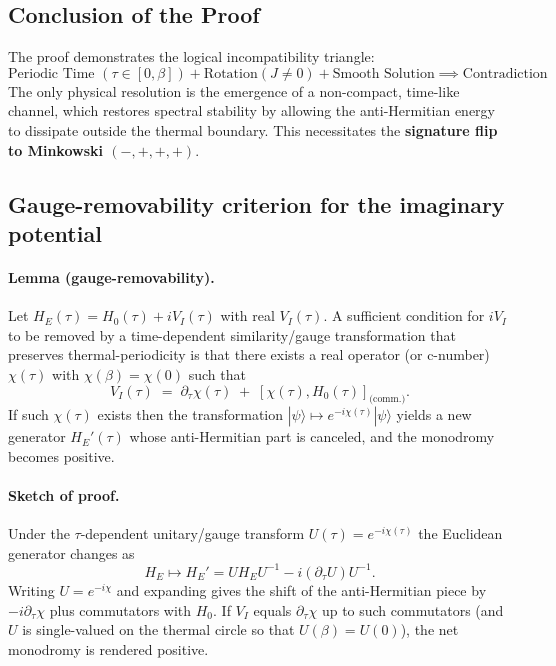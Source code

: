 \documentclass[11pt]{article}
\begin{document}
\subsection{Conclusion of the Proof}

The proof demonstrates the logical incompatibility triangle:
\[
    \text{Periodic Time } (\tau \in [0,\beta]) + \text{Rotation} (J \neq 0) + \text{Smooth Solution} \implies \text{Contradiction}
\]
The only physical resolution is the emergence of a non-compact, time-like channel, which restores spectral stability by allowing the anti-Hermitian energy to dissipate outside the thermal boundary. This necessitates the \textbf{signature flip to Minkowski $(-,+,+,+)$}.


\subsection*{Gauge-removability criterion for the imaginary potential}

\paragraph{Lemma (gauge-removability).}
Let \(H_E(\tau)=H_0(\tau)+iV_I(\tau)\) with real \(V_I(\tau)\). A sufficient condition for \(iV_I\) to be removed by a time-dependent similarity/gauge transformation that preserves thermal-periodicity is that there exists a real operator (or c-number) \(\chi(\tau)\) with \(\chi(\beta)=\chi(0)\) such that
\[
V_I(\tau) \;=\; \partial_\tau\chi(\tau) \;+\; [\chi(\tau),H_0(\tau)]_{\text{(comm.)}}.
\]
If such \(\chi(\tau)\) exists then the transformation \(|\psi\rangle\mapsto e^{-i\chi(\tau)}|\psi\rangle\) yields a new generator \(H_E'(\tau)\) whose anti-Hermitian part is canceled, and the monodromy becomes positive.

\paragraph{Sketch of proof.}
Under the \(\tau\)-dependent unitary/gauge transform \(U(\tau)=e^{-i\chi(\tau)}\) the Euclidean generator changes as
\[
H_E \mapsto H_E' = U H_E U^{-1} - i(\partial_\tau U)U^{-1} .
\]
Writing \(U=e^{-i\chi}\) and expanding gives the shift of the anti-Hermitian piece by \(-i\partial_\tau\chi\) plus commutators with \(H_0\). If \(V_I\) equals \(\partial_\tau\chi\) up to such commutators (and \(U\) is single-valued on the thermal circle so that \(U(\beta)=U(0)\)), the net monodromy is rendered positive.
\end{document}

